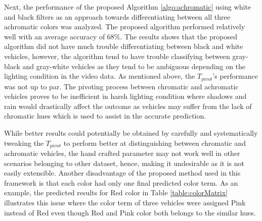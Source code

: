 Next, the performance of the proposed Algorithm \ref{algo:achromatic} using white and black filters as an approach towards differentiating between all three achromatic colors was analyzed. The proposed algorithm performed relatively well with an average accuracy of 68\%. The results shows that the proposed algorithm did not have much trouble differentiating between black and white vehicles, however, the algorithm tend to have trouble classifying between gray-black and gray-white vehicles as they tend to be ambiguous depending on the lighting condition in the video data. As mentioned above, the $T_{pivot}$'s performance was not up to par. The pivoting process between chromatic and achromatic vehicles proves to be inefficient in harsh lighting condition where shadows and rain would drastically affect the outcome as vehicles may suffer from the lack of chromatic hues which is used to assist in the accurate prediction.

While better results could potentially be obtained by carefully and systematically tweaking the $T_{pivot}$ to perform better at distinguishing between chromatic and achromatic vehicles, the hand crafted parameter may not work well in other scenarios belonging to other dataset, hence, making it undesirable as it is not easily extensible. Another disadvantage of the proposed method used in this framework is that each color had only one final predicted color term. As an example, the predicted results for Red color in Table \ref{table:colorMatrix} illustrates this issue where the color term of three vehicles were assigned Pink instead of Red even though Red and Pink color both belongs to the similar hues. 


